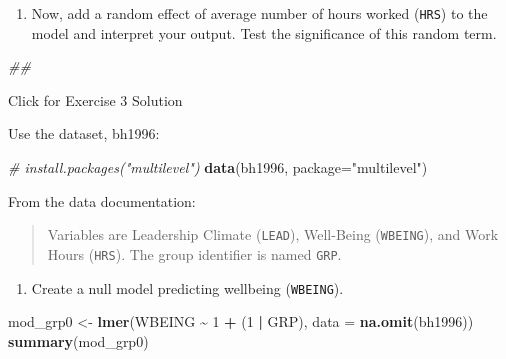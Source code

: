\documentclass[
]{book}
\newenvironment{Shaded}{\begin{snugshade}}{\end{snugshade}}
\newcommand{\CommentTok}[1]{\textcolor[rgb]{0.56,0.35,0.01}{\textit{#1}}}
\newcommand{\DataTypeTok}[1]{\textcolor[rgb]{0.13,0.29,0.53}{#1}}
\newcommand{\DecValTok}[1]{\textcolor[rgb]{0.00,0.00,0.81}{#1}}
\newcommand{\KeywordTok}[1]{\textcolor[rgb]{0.13,0.29,0.53}{\textbf{#1}}}
\newcommand{\NormalTok}[1]{#1}
\newcommand{\OperatorTok}[1]{\textcolor[rgb]{0.81,0.36,0.00}{\textbf{#1}}}
\newcommand{\StringTok}[1]{\textcolor[rgb]{0.31,0.60,0.02}{#1}}
\providecommand{\tightlist}{%
  \setlength{\itemsep}{0pt}\setlength{\parskip}{0pt}}
\begin{document}
\begin{enumerate}
\def\labelenumi{\arabic{enumi}.}
\setcounter{enumi}{3}
\tightlist
\item
  Now, add a random effect of average number of hours worked (\texttt{HRS}) to the model and interpret your output. Test the significance of this random term.
\end{enumerate}

\begin{Shaded}
\begin{Highlighting}[]
\CommentTok{\#\# }
\end{Highlighting}
\end{Shaded}

{Click for Exercise 3 Solution}

\begin{alert}

Use the dataset, bh1996:

\begin{Shaded}
\begin{Highlighting}[]
  \CommentTok{\# install.packages("multilevel")}
  \KeywordTok{data}\NormalTok{(bh1996, }\DataTypeTok{package=}\StringTok{"multilevel"}\NormalTok{)}
\end{Highlighting}
\end{Shaded}

From the data documentation:

\begin{quote}
Variables are Leadership Climate (\texttt{LEAD}), Well-Being (\texttt{WBEING}), and Work Hours (\texttt{HRS}). The group identifier is named \texttt{GRP}.
\end{quote}

\begin{enumerate}
\def\labelenumi{\arabic{enumi}.}
\tightlist
\item
  Create a null model predicting wellbeing (\texttt{WBEING}).
\end{enumerate}

\begin{Shaded}
\begin{Highlighting}[]
\NormalTok{  mod\_grp0 \textless{}{-}}\StringTok{ }\KeywordTok{lmer}\NormalTok{(WBEING }\OperatorTok{\textasciitilde{}}\StringTok{ }\DecValTok{1} \OperatorTok{+}\StringTok{ }\NormalTok{(}\DecValTok{1} \OperatorTok{|}\StringTok{ }\NormalTok{GRP), }\DataTypeTok{data =} \KeywordTok{na.omit}\NormalTok{(bh1996))}
  \KeywordTok{summary}\NormalTok{(mod\_grp0)}
\end{Highlighting}
\end{Shaded}


\end{alert}
\end{document}
